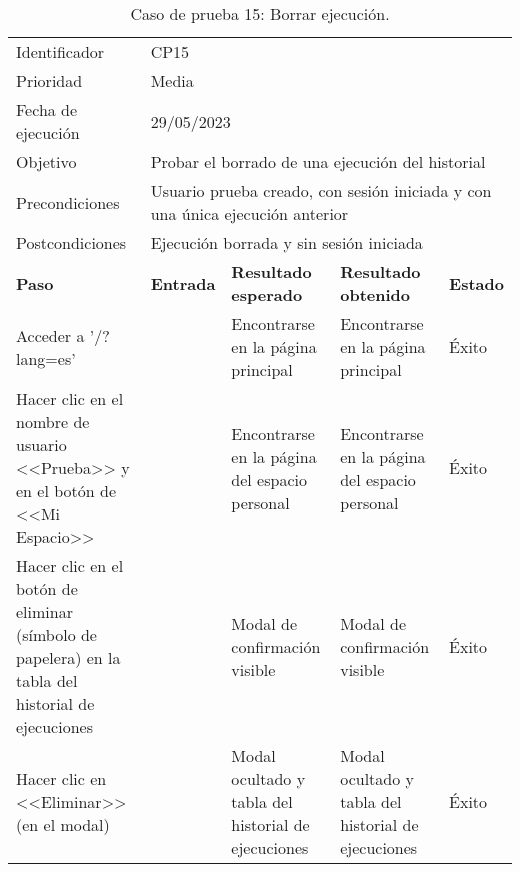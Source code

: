 \begin{table}[H]
\begin{tabular}{p{}p{}p{}p{}p{}}
\rowcolor{gray!25}
Identificador   & \multicolumn{4}{l}{CP15}                                                   \\
Prioridad   & \multicolumn{4}{l}{Media}                                                    \\
\rowcolor{gray!25}
Fecha de ejecución   & \multicolumn{4}{l}{29/05/2023}                                                    \\
Objetivo        & \multicolumn{4}{p{0.80\textwidth}}{Probar el borrado de una ejecución del historial}                                                     \\
\rowcolor{gray!25}
Precondiciones  & \multicolumn{4}{p{0.80\textwidth}}{Usuario prueba creado, con sesión iniciada y con una única ejecución anterior}                                                     \\
Postcondiciones & \multicolumn{4}{l}{Ejecución borrada y sin sesión iniciada}                                                     \\ \hline
\rowcolor{gray!25}
\textbf{Paso}   & \textbf{Entrada} & \textbf{Resultado esperado} & \textbf{Resultado obtenido} & \textbf{Estado} \\ \hline
Acceder a '/?lang=es'                                 &                        & Encontrarse en la página principal                                   & Encontrarse en la página principal                           & Éxito  \\ \hline
Hacer clic en el nombre de usuario <<Prueba>> y en el botón de <<Mi Espacio>>  &     & Encontrarse en la página del espacio personal                  & Encontrarse en la página del espacio personal                       & Éxito  \\ \hline 
Hacer clic en el botón de eliminar (símbolo de papelera) en la tabla del historial de ejecuciones &                     & Modal de confirmación visible                                     & Modal de confirmación visible                     & Éxito                            \\ \hline
Hacer clic en <<Eliminar>> (en el modal)              &                        & Modal ocultado y tabla del historial de ejecuciones                    & Modal ocultado y tabla del historial de ejecuciones            & Éxito                            \\ \hline
\end{tabular}
\caption{Caso de prueba 15: Borrar ejecución.}
\end{table}

